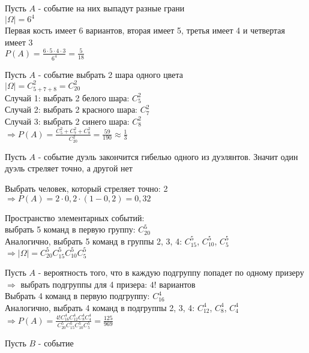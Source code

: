 \begin{exercise}[4]
	Пусть $A$ - событие на них выпадут разные грани \\ $| \Omega | = 6^4$ \\ Первая кость имеет 6 вариантов, вторая имеет 5, третья имеет 4 и четвертая имеет 3 \\ $P(A) = \frac{6 \cdot 5 \cdot 4 \cdot 3}{6^4} = \frac{5}{18}$
\end{exercise}

\begin{exercise}[5]
	Пусть $A$ - событие выбрать 2 шара одного цвета \\ $| \Omega | = C^2_{5+7+8} = C^2_{20}$ \\ Случай 1: выбрать 2 белого шара: $C^2_5$ \\ Случай 2: выбрать 2 красного шара: $C^2_7$ \\ Случай 3: выбрать 2 синего шара: $C^2_8$ \\ $\Rightarrow P(A) = \frac{C^2_5 + C^2_7 + C^2_8}{C^2_{20}} = \frac{59}{190} \approx \frac{1}{3}$ 
\end{exercise}
	
\begin{exercise}[6]
	Пусть $A$ - событие дуэль закончится гибелью одного из дуэлянтов. Значит один дуэль стреляет точно, а другой нет
	
	Выбрать человек, который стреляет точно: 2 \\ $\Rightarrow P(A) = 2 \cdot 0,2 \cdot (1 - 0,2) = 0,32$	
\end{exercise}

\begin{exercise}[7]
	Пространство элементарных событий: \\ выбрать 5 команд в первую группу: $C^5_{20}$ \\ Аналогично, выбрать 5 команд в группы 2, 3, 4: $C^5_{15}$, $C^5_{10}$, $C^5_5$ \\ $\Rightarrow | \Omega | = C^5_{20} C^5_{15} C^5_{10} C^5_5$
	
	Пусть $A$ - вероятность того, что в каждую подгруппу попадет по одному призеру \\ $\Rightarrow$ выбрать  подгруппы для 4 призера: $4!$ вариантов \\ Выбрать 4 команд в первую подгруппу: $C^4_{16}$ \\ Аналогично, выбрать 4 команд в подгруппы 2, 3, 4: $C^4_{12}$, $C^4_8$, $C^4_4$ \\ $\Rightarrow P(A) = \frac{4! C^4_{16} C^4_{12} C^4_8 C^4_4}{C^5_{20} C^5_{15} C^5_{10} C^5_5} = \frac{125}{969}$
	
	Пусть $B$ - событие 
\end{exercise}
	
